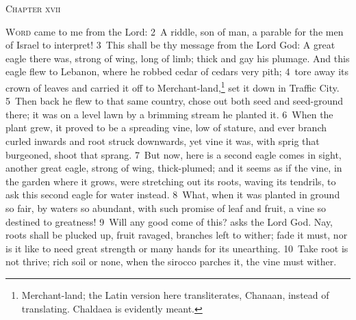 \documentclass[10pt]{book} %
\begin{document}
\begin{large}\begin{center}\textsc{Chapter xvii}\end{center}\end{large}
\lettrine[lines=2]{W}{ord} came to me from the Lord: \textcolor{benred8}{2}~A riddle, son of man, a parable for the men of Israel to interpret! \textcolor{benred8}{3}~This shall be thy message from the Lord God: A great eagle there was, strong of wing, long of limb; thick and gay his plumage. And this eagle flew to Lebanon, where he robbed cedar of cedar\textquotesingle s very pith; \textcolor{benred8}{4}~tore away its crown of leaves and carried it off to Merchant-land,\footnote[1]{\textasciigrave Merchant-land\textquotesingle ; the Latin version here transliterates, \textasciigrave Chanaan\textquotesingle , instead of translating. Chaldaea is evidently meant.} set it down in Traffic City. \textcolor{benred8}{5}~Then back he flew to that same country, chose out both seed and seed-ground there; it was on a level lawn by a brimming stream he planted it. \textcolor{benred8}{6}~When the plant grew, it proved to be a spreading vine, low of stature, and ever branch curled inwards and root struck downwards, yet vine it was, with sprig that burgeoned, shoot that sprang. \textcolor{benred8}{7}~But now, here is a second eagle comes in sight, another great eagle, strong of wing, thick-plumed; and it seems as if the vine, in the garden where it grows, were stretching out its roots, waving its tendrils, to ask this second eagle for water instead. \textcolor{benred8}{8}~What, when it was planted in ground so fair, by waters so abundant, with such promise of leaf and fruit, a vine so destined to greatness! \textcolor{benred8}{9}~Will any good come of this? asks the Lord God. Nay, roots shall be plucked up, fruit ravaged, branches left to wither; fade it must, nor is it like to need great strength or many hands for its unearthing. \textcolor{benred8}{10}~Take root is not thrive; rich soil or none, when the sirocco parches it, the vine must wither.
\end{document}
